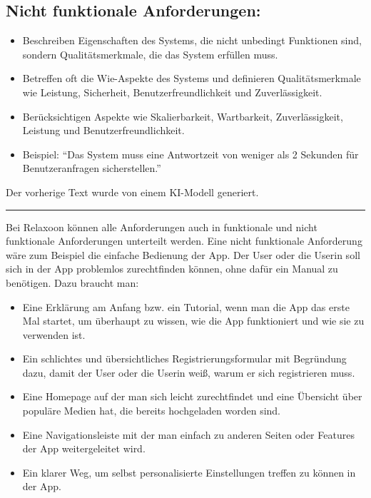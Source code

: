 \subsection{Nicht funktionale Anforderungen:}
\begin{itemize}
  \item Beschreiben Eigenschaften des Systems, die nicht unbedingt Funktionen sind, sondern Qualitätsmerkmale, die das System erfüllen muss.
  \item Betreffen oft die Wie-Aspekte des Systems und definieren Qualitätsmerkmale wie Leistung, Sicherheit, Benutzerfreundlichkeit und Zuverlässigkeit.
  \item Berücksichtigen Aspekte wie Skalierbarkeit, Wartbarkeit, Zuverlässigkeit, Leistung und Benutzerfreundlichkeit.
  \item Beispiel: "`Das System muss eine Antwortzeit von weniger als 2 Sekunden für Benutzeranfragen sicherstellen."'
\end{itemize}

Der vorherige Text wurde von einem KI-Modell generiert.\cite{chatgpt}

\rule{\linewidth}{0.5pt}

Bei Relaxoon können alle Anforderungen auch in funktionale und nicht funktionale Anforderungen unterteilt werden.
Eine nicht funktionale Anforderung wäre zum Beispiel die einfache Bedienung der App. Der User oder die Userin
soll sich in der App problemlos zurechtfinden können, ohne dafür ein Manual zu benötigen. Dazu braucht man:
\begin{itemize}
      \item  Eine Erklärung am Anfang bzw. ein Tutorial, wenn man die App das erste Mal startet, um überhaupt 
      zu wissen, wie die App funktioniert und wie sie zu verwenden ist.
      \item Ein schlichtes und übersichtliches Registrierungsformular mit Begründung dazu, damit der User oder
      die Userin weiß, warum er sich registrieren muss.
      \item Eine Homepage auf der man sich leicht zurechtfindet und eine Übersicht über populäre Medien hat, die
      bereits hochgeladen worden sind.
      \item Eine Navigationsleiste mit der man einfach zu anderen Seiten oder Features der App weitergeleitet wird.
      \item Ein klarer Weg, um selbst personalisierte Einstellungen treffen zu können in der App. 
\end{itemize}


